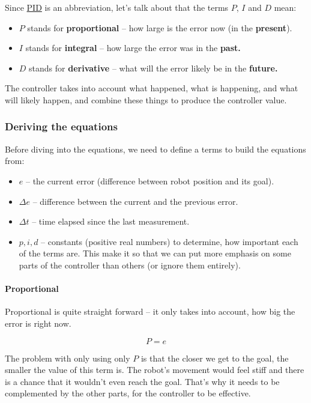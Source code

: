 \documentclass[12pt,twoside]{article}
\let\subsubsubsection\paragraph
\begin{document}
Since \href{https://en.wikipedia.org/wiki/PID_controller}{PID} is an abbreviation, let's talk about that the terms $P$, $I$ and $D$ mean:
\begin{itemize}
\item $P$ stands for \textbf{proportional} -- how large is the error now (in the \textbf{present}).
\item $I$ stands for \textbf{integral} -- how large the error was in the \textbf{past.}
\item $D$ stands for \textbf{derivative} -- what will the error likely be in the \textbf{future.}
\end{itemize}\vspace{\parskip}

The controller takes into account what happened, what is happening, and what will likely happen, and combine these things to produce the controller value.


\subsubsection{Deriving the equations}
Before diving into the equations, we need to define a terms to build the equations from:
\begin{itemize}
\item $e$ -- the current error (difference between robot position and its goal).
\item $\Delta e$ -- difference between the current and the previous error.
\item $\Delta t$ -- time elapsed since the last measurement.
\item $p, i, d$ -- constants (positive real numbers) to determine, how important each of the terms are. This make it so that we can put more emphasis on some parts of the controller than others (or ignore them entirely).
\end{itemize}\vspace{\parskip}


\subsubsubsection{Proportional}
Proportional is quite straight forward -- it only takes into account, how big the error is right now.

\vspace{-\parskip}\[P = e\]

The problem with only using only $P$ is that the closer we get to the goal, the smaller the value of this term is. The robot's movement would feel stiff and there is a chance that it wouldn't even reach the goal. That's why it needs to be complemented by the other parts, for the controller to be effective.
\end{document}
